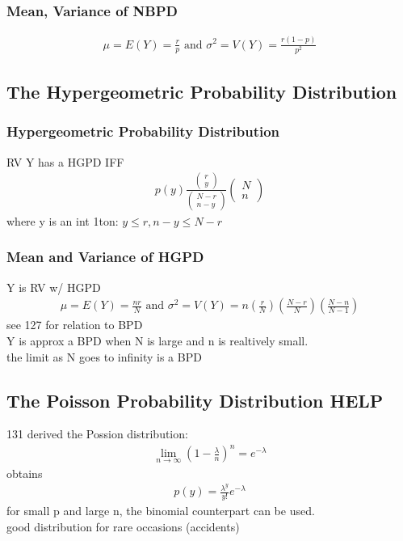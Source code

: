 \documentclass[12pt]{article}
\begin{document}
    \subsubsection{Mean, Variance of NBPD}
        \begin{align*}
            \mu = E(Y) = \frac{r}{p} \text{ and }
            \sigma ^2 = V(Y) = \frac{r(1-p)}{p^2} 
        \end{align*} 
\subsection{The Hypergeometric Probability Distribution}
    \subsubsection{Hypergeometric Probability Distribution}
        RV Y has a HGPD IFF
        \begin{align*}
            p(y) \frac{\begin{pmatrix}r\\y\end{pmatrix}}
            {\begin{pmatrix}N-r\\n-y\end{pmatrix}}
            {\begin{pmatrix}N\\n\end{pmatrix}} 
        \end{align*}
        where y is an int 1ton:
        $ y \le r, n-y \le N-r $
    \subsubsection{Mean and Variance of HGPD}
        Y is RV w/ HGPD
        \begin{align*}
             \mu = E(Y) = \frac{nr}{N} \text{ and } \sigma ^2 = V(Y) = 
            n(\frac{r}{N})(\frac{N-r}{N})(\frac{N-n}{N-1})
        \end{align*}
        see 127 for relation to BPD\\
        Y is approx a BPD when N is large and n is realtively small.\\
        the limit as N goes to infinity is a BPD
\subsection{The Poisson Probability Distribution HELP}
    131 derived the Possion distribution:
    \begin{align*}
        \lim_{n\to\infty}(1-\frac{\lambda }{n} )^n = e^{-\lambda }
    \end{align*}
    obtains
    \begin{align*}
        p(y) = \frac{\lambda ^{y}}{y!}e^{-\lambda } 
    \end{align*}
    for small p and large n, the binomial counterpart can be used.\\
    good distribution for rare occasions (accidents)
\end{document}
